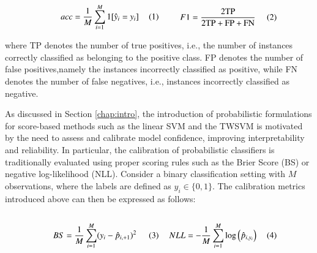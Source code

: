 \documentclass[12pt]{report} %
\begin{document}
\begin{subequations}
\begin{minipage}[c]{0.40\textwidth}
\begin{equation}
acc = \frac{1}{M} \sum_{i=1}^{M} 1[\hat{y}_i = y_i]
\end{equation}
\end{minipage}
\begin{minipage}[c]{0.40\textwidth}
\begin{equation}
F1 = \frac{\text{2TP}}{\text{2TP} + \text{FP} + \text{FN}}
\end{equation}
\end{minipage}
\label{eq:calibration_metrics}
\end{subequations}

where TP denotes the number of true positives, i.e., the number of instances correctly classified as belonging to the positive class. FP denotes the number of false positives,namely the instances incorrectly classified as positive, while FN denotes the number of false negatives, i.e., instances incorrectly classified as negative.

As discussed in Section \ref{chap:intro}, the introduction of probabilistic formulations for score-based methods such as the linear SVM and the TWSVM is motivated by the need to assess and calibrate model confidence, improving interpretability and reliability. In particular, the calibration of probabilistic classifiers is traditionally evaluated using proper scoring rules such as the Brier Score (BS) or negative log-likelihood (NLL). Consider a binary classification setting with $M$ observations, where the labels are defined as $y_i \in \{0,1\}$. The calibration metrics introduced above can then be expressed as follows:

\begin{subequations}
\begin{minipage}{0.40\textwidth}
\begin{equation}
BS = \frac{1}{M} \sum_{i=1}^{M} (y_i - \hat{p}_{i,+1})^2
\end{equation}
\end{minipage}
\begin{minipage}{0.40\textwidth}
\begin{equation}
NLL = - \frac{1}{M} \sum_{i=1}^{M} \log \left( \hat{p}_{i,y_i} \right)
\end{equation}
\end{minipage}
\label{eq:calibration_metrics}
\end{subequations}
\end{document}
